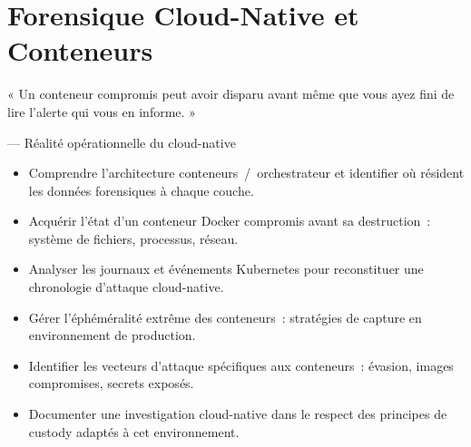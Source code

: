 
\chapter{Forensique Cloud-Native et Conteneurs}
\label{chap:containers}

\epigraph{%
    « Un conteneur compromis peut avoir disparu avant même que vous
    ayez fini de lire l'alerte qui vous en informe. »%
}{--- Réalité opérationnelle du cloud-native}


\begin{boxobjectifs}
\begin{itemize}
    \item Comprendre l'architecture conteneurs~/~orchestrateur et
          identifier où résident les données forensiques à chaque couche.
    \item Acquérir l'état d'un conteneur Docker compromis avant
          sa destruction~: système de fichiers, processus, réseau.
    \item Analyser les journaux et événements Kubernetes pour
          reconstituer une chronologie d'attaque cloud-native.
    \item Gérer l'éphéméralité extrême des conteneurs~: stratégies
          de capture en environnement de production.
    \item Identifier les vecteurs d'attaque spécifiques aux
          conteneurs~: évasion, images compromises, secrets exposés.
    \item Documenter une investigation cloud-native dans le respect
          des principes de custody adaptés à cet environnement.
\end{itemize}
\end{boxobjectifs}

